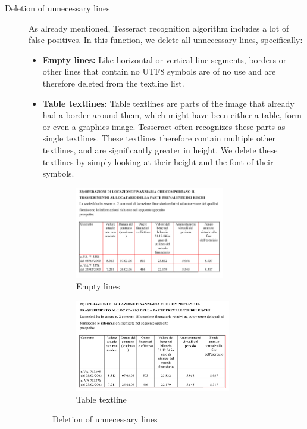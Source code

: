 \begin{description}
\item[Deletion of unnecessary lines]

As already mentioned, Tesseract recognition algorithm includes a lot of false positives. In this function, we delete all unnecessary lines, specifically:

\begin{itemize}
\item\textbf {Empty lines: } Like horizontal or vertical line segments, borders or other lines that contain no UTF8 symbols are of no use and are therefore deleted from the textline list.

\item\textbf {Table textlines: } Table textlines are parts of the image that already had a border around them, which might have been either a table, form or even a graphics image. Tesseract often recognizes these parts as single textlines. These textlines therefore contain multiple other textlines, and are significantly greater in height. We delete these textlines by simply looking at their height and the font of their symbols.
\end{itemize}

\begin{figure}[H]
\begin{subfigure}{0.45\textwidth}
\includegraphics[width=\linewidth,height=40mm]{img/implementation/textlineEmpty.png}
\caption{Empty lines} \label{fig:1b}
\end{subfigure}
\qquad
\begin{subfigure}{0.45\textwidth}
\includegraphics[width=\linewidth,height=40mm]{img/implementation/textlineTable.png}
\caption{Table textline} \label{fig:1c}
\end{subfigure}
\caption{Deletion of unnecessary lines} \label{fig:1}
\end{figure}


\end{description}
